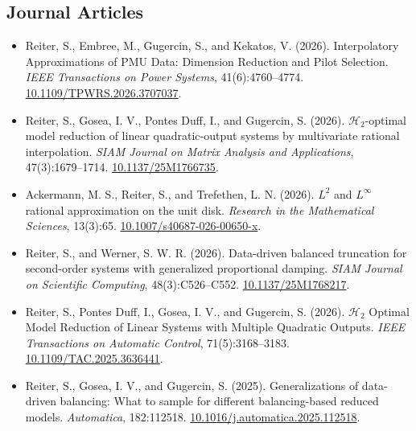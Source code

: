 \documentclass[10pt,a4paper,sans]{moderncv}        %
\begin{document}
\subsection{Journal Articles}
\vspace{5pt}
\begin{itemize}
    \item Reiter, S., Embree, M., Gugercin, S., and Kekatos, V. (2026). Interpolatory Approximations of PMU Data: Dimension Reduction and Pilot Selection. \textit{IEEE Transactions on Power Systems}, 41(6):4760--4774. \url{10.1109/TPWRS.2026.3707037}.
    \vspace{2pt}

    \item Reiter, S., Gosea, I. V., Pontes Duff, I., and Gugercin, S. (2026). $\mathcal{H}_2$-optimal model reduction of linear quadratic-output systems by multivariate rational interpolation. \textit{SIAM Journal on Matrix Analysis and Applications}, 47(3):1679--1714. \url{10.1137/25M1766735}.
    \vspace{2pt}

    \item Ackermann, M. S., Reiter, S., and Trefethen, L. N. (2026). $L^2$ and $L^\infty$ rational approximation on the unit disk. \textit{Research in the Mathematical Sciences}, 13(3):65. \url{10.1007/s40687-026-00650-x}.
    \vspace{2pt}

    \item Reiter, S., and Werner, S. W. R. (2026). Data-driven balanced truncation for second-order systems with generalized proportional damping. \textit{SIAM Journal on Scientific Computing}, 48(3):C526--C552. \url{10.1137/25M1768217}.
    \vspace{2pt}

    \item Reiter, S., Pontes Duff, I., Gosea, I. V., and Gugercin, S. (2026). $\mathcal{H}_2$ Optimal Model Reduction of Linear Systems with Multiple Quadratic Outputs. \textit{IEEE Transactions on Automatic Control}, 71(5):3168--3183. \url{10.1109/TAC.2025.3636441}.
    \vspace{2pt}

    \item Reiter, S., Gosea, I. V., and Gugercin, S. (2025). Generalizations of data-driven balancing: What to sample for different balancing-based reduced models. \textit{Automatica}, 182:112518. \url{10.1016/j.automatica.2025.112518}. %
    \vspace{2pt}


\end{itemize}
\end{document}
